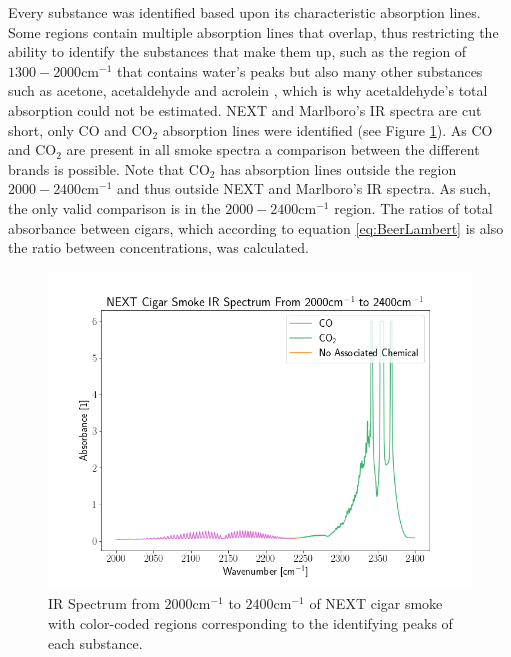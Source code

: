 \documentclass[reprint,amsmath,amssymb,aps, prl,superscriptaddress]{revtex4-2}
\begin{document}
Every substance was identified based upon its characteristic absorption lines\cite{NISTwebook}\cite{IRCEllSMOKE}. 
Some regions contain multiple absorption lines that overlap, thus restricting the ability to identify the substances that make them up, such as the region of $1300-2000\text{cm}^{-1}$ that contains water's peaks but also many other substances such as acetone, acetaldehyde and acrolein \cite{FTIRSPECTRAOFSMOKE}, which is why acetaldehyde's total absorption could not be estimated. 
NEXT and Marlboro's IR spectra are cut short, only CO and $\text{CO}_{2}$ absorption lines were identified (see Figure \ref{fig:COCO2NEXT}).
As CO and $\text{CO}_{2}$ are present in all smoke spectra a comparison between the different brands is possible. Note that $\text{CO}_{2}$ has absorption lines outside the region $2000-2400 \text{cm}^{-1}$ and thus outside NEXT and Marlboro's IR spectra. As such, the only valid comparison is in the $2000-2400 \text{cm}^{-1}$ region. The ratios of total absorbance between cigars, which according to equation \ref{eq:BeerLambert} is also the ratio between concentrations, was calculated.

\begin{figure}[H]
    \includegraphics[width=\linewidth]{Images/Colored Cigar Spectrums/NEXT_CO-CO2_Spectrum.png} 
    \caption{IR Spectrum from $2000 \text{cm}^{-1}$ to $2400 \text{cm}^{-1}$ of NEXT cigar smoke with color-coded regions corresponding to the identifying peaks of each substance.}
    \label{fig:COCO2NEXT}
\end{figure}
\end{document}
